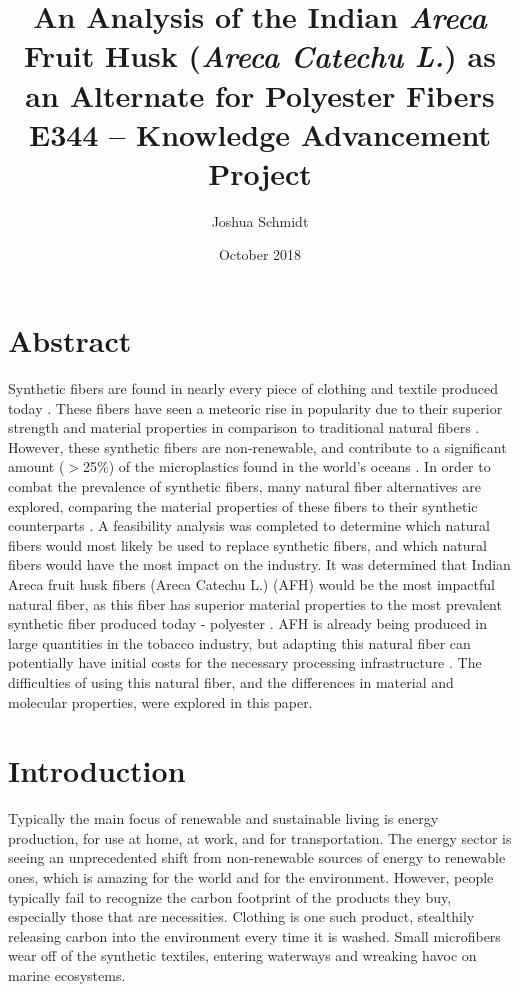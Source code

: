 \documentclass{article}
\title{%
	An Analysis of the Indian \textit{Areca} Fruit Husk (\textit{Areca Catechu L.}) as an Alternate for Polyester Fibers \\
	\large E344 – Knowledge Advancement Project}
\date{October 2018}
\author{Joshua Schmidt }
\begin{document}
\maketitle
\section{Abstract}

Synthetic fibers are found in nearly every piece of clothing and textile produced today \autocite{ihsmarkit}. These fibers have seen a meteoric rise in popularity due to their superior strength and material properties in comparison to traditional natural fibers \autocite{craftechindustries}. However, these synthetic fibers are non-renewable, and contribute to a significant amount ($>$25\%) of the microplastics found in the world's oceans \autocite{quantifyingfibers}\autocite{noaamicroplastics}. In order to combat the prevalence of synthetic fibers, many natural fiber alternatives are explored, comparing the material properties of these fibers to their synthetic counterparts \autocite{naturalfiberreview}. A feasibility analysis was completed to determine which natural fibers would most likely be used to replace synthetic fibers, and which natural fibers would have the most impact on the industry. It was determined that Indian Areca fruit husk fibers (Areca Catechu L.) (AFH) would be the most impactful natural fiber, as this fiber has superior material properties to the most prevalent synthetic fiber produced today - polyester \autocite{afhfiber}. AFH is already being produced in large quantities in the tobacco industry, but adapting this natural fiber can potentially have initial costs for the necessary processing infrastructure \autocite{afhfiber}. The difficulties of using this natural fiber, and the differences in material and molecular properties, were explored in this paper.

\section{Introduction}

Typically the main focus of renewable and sustainable living is energy production, for use at home, at work, and for transportation. The energy sector is seeing an unprecedented shift from non-renewable sources of energy to renewable ones, which is amazing for the world and for the environment. However, people typically fail to recognize the carbon footprint of the products they buy, especially those that are necessities. Clothing is one such product, stealthily releasing carbon into the environment every time it is washed. Small microfibers wear off of the synthetic textiles, entering waterways and wreaking havoc on marine ecosystems.
\end{document}
